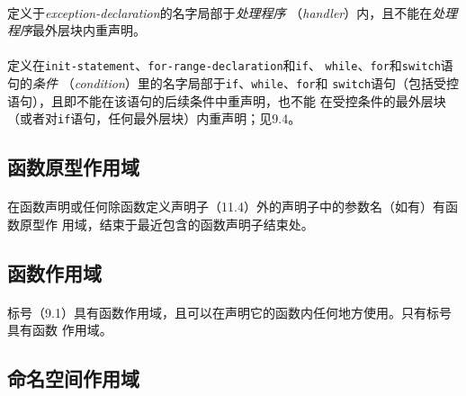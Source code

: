 \paragraph{}
定义于\textit{exception-declaration}的名字局部于\textit{处理程序}
（\textit{handler}）内，且不能在\textit{处理程序}最外层块内重声明。

\paragraph{}
定义在\texttt{init-statement}、\texttt{for-range-declaration}和\texttt{if}、
\texttt{while}、\texttt{for}和\texttt{switch}语句的\textit{条件}
（\textit{condition}）里的名字局部于\texttt{if}、\texttt{while}、\texttt{for}和
\texttt{switch}语句（包括受控语句），且即不能在该语句的后续条件中重声明，也不能
在受控条件的最外层块（或者对\texttt{if}语句，任何最外层块）内重声明；见9.4。

\subsection{函数原型作用域}
\paragraph{}
在函数声明或任何除函数定义声明子（11.4）外的声明子中的参数名（如有）有函数原型作
用域，结束于最近包含的函数声明子结束处。

\subsection{函数作用域}
\paragraph{}
标号（9.1）具有函数作用域，且可以在声明它的函数内任何地方使用。只有标号具有函数
作用域。

\subsection{命名空间作用域}
